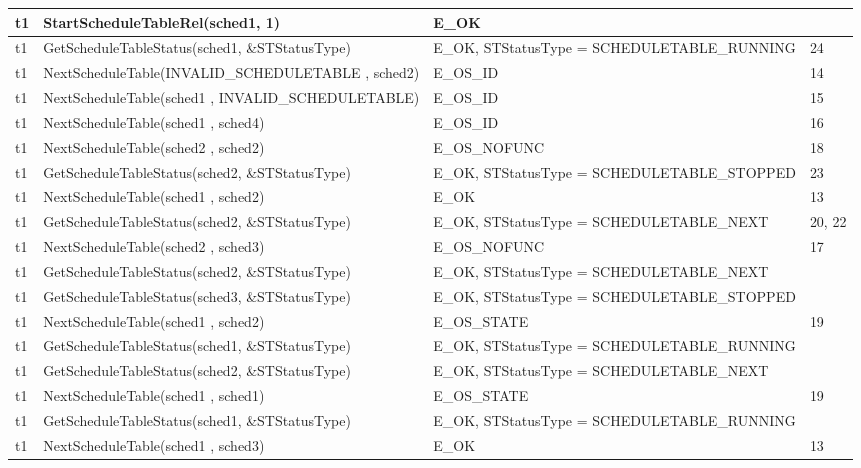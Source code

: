 \documentclass[10pt]{article}
\newlength{\Li}\settowidth{\Li}{Running}
\newlength{\Lii}\setlength{\Lii}{7cm}
\newlength{\Liiii}\setlength{\Liiii}{0.9cm}
\newlength{\Liii}\setlength{\Liii}{\textwidth} \addtolength{\Liii}{-\Li} \addtolength{\Liii}{-\Lii} \addtolength{\Liii}{-\Liiii}
\begin{document}
	\begin{supertabular}{|p{\Li}|p{\Lii}|p{\Liii}|p{\Liiii}|} \hline 
	t1	& StartScheduleTableRel(sched1, 1)									& E\_OK												& \\ \hline
	t1	& GetScheduleTableStatus(sched1, \&STStatusType)						& E\_OK, STStatusType = SCHEDULETABLE\_RUNNING		& 24 \\ \hline
	t1	& NextScheduleTable(INVALID\_SCHEDULETABLE , sched2)				& E\_OS\_ID											& 14 \\ \hline
	
	t1	& NextScheduleTable(sched1 , INVALID\_SCHEDULETABLE)				& E\_OS\_ID											& 15 \\ \hline
	t1	& NextScheduleTable(sched1 , sched4)									& E\_OS\_ID											& 16 \\ \hline
	t1	& NextScheduleTable(sched2 , sched2)									& E\_OS\_NOFUNC										& 18\\ \hline
	t1	& GetScheduleTableStatus(sched2, \&STStatusType)						& E\_OK, STStatusType = SCHEDULETABLE\_STOPPED		& 23 \\ \hline
	t1	& NextScheduleTable(sched1 , sched2)									& E\_OK												& 13 \\ \hline
	t1	& GetScheduleTableStatus(sched2, \&STStatusType)						& E\_OK, STStatusType = SCHEDULETABLE\_NEXT			& 20, 22 \\ \hline
	t1	& NextScheduleTable(sched2 , sched3)									& E\_OS\_NOFUNC										& 17 \\ \hline
	t1	& GetScheduleTableStatus(sched2, \&STStatusType)						& E\_OK, STStatusType = SCHEDULETABLE\_NEXT			& \\ \hline
	t1	& GetScheduleTableStatus(sched3, \&STStatusType)						& E\_OK, STStatusType = SCHEDULETABLE\_STOPPED		& \\ \hline
	t1	& NextScheduleTable(sched1 , sched2)									& E\_OS\_STATE										& 19 \\ \hline
	t1	& GetScheduleTableStatus(sched1, \&STStatusType)						& E\_OK, STStatusType = SCHEDULETABLE\_RUNNING		& \\ \hline
	t1	& GetScheduleTableStatus(sched2, \&STStatusType)						& E\_OK, STStatusType = SCHEDULETABLE\_NEXT			& \\ \hline
	t1	& NextScheduleTable(sched1 , sched1)									& E\_OS\_STATE										& 19 \\ \hline
	t1	& GetScheduleTableStatus(sched1, \&STStatusType)						& E\_OK, STStatusType = SCHEDULETABLE\_RUNNING		& \\ \hline
	t1	& NextScheduleTable(sched1 , sched3)									& E\_OK												& 13 \\ \hline

\end{supertabular}
\end{document}
